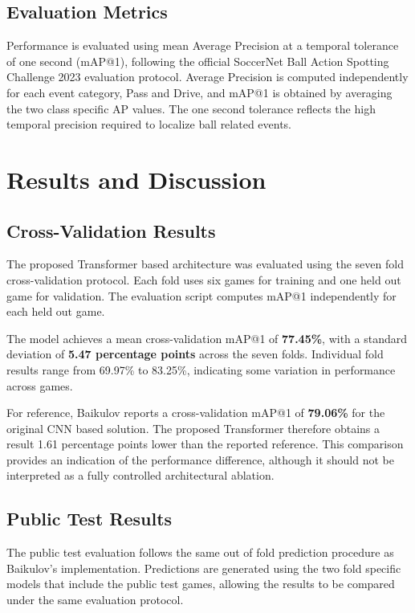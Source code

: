 \documentclass[conference]{IEEEtran}
\begin{document}
\subsection{Evaluation Metrics}
Performance is evaluated using mean Average Precision at a temporal tolerance of one second (mAP@1), following the official SoccerNet Ball Action Spotting Challenge 2023 evaluation protocol. Average Precision is computed independently for each event category, Pass and Drive, and mAP@1 is obtained by averaging the two class specific AP values. The one second tolerance reflects the high temporal precision required to localize ball related events.


\section{Results and Discussion}
\subsection{Cross-Validation Results}

The proposed Transformer based architecture was evaluated using the seven fold cross-validation protocol. Each fold uses six games for training and one held out game for validation. The evaluation script computes mAP@1 independently for each held out game.

The model achieves a mean cross-validation mAP@1 of \textbf{77.45\%}, with a standard deviation of \textbf{5.47 percentage points} across the seven folds. Individual fold results range from 69.97\% to 83.25\%, indicating some variation in performance across games.

For reference, Baikulov reports a cross-validation mAP@1 of \textbf{79.06\%} for the original CNN based solution. The proposed Transformer therefore obtains a result 1.61 percentage points lower than the reported reference. This comparison provides an indication of the performance difference, although it should not be interpreted as a fully controlled architectural ablation.

\subsection{Public Test Results}

The public test evaluation follows the same out of fold prediction procedure as Baikulov's implementation. Predictions are generated using the two fold specific models that include the public test games, allowing the results to be compared under the same evaluation protocol.
\end{document}

